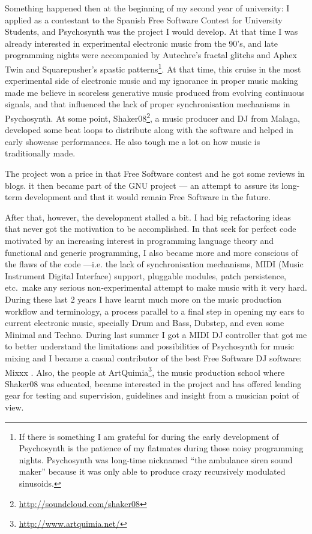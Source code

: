 Something happened then at the beginning of my second year of
university: I applied as a contestant to the Spanish Free Software
Contest for University Students, and Psychosynth was the project I
would develop. At that time I was already interested in experimental
electronic music from the 90's, and late programming nights were
accompanied by Autechre's fractal glitchs and Aphex Twin and
Squarepusher's spastic patterns\footnote{If there is something I am
  grateful for during the early development of Psychosynth is the
  patience of my flatmates during those noisy programming
  nights. Psychosynth was long-time nicknamed ``the ambulance siren
  sound maker'' because it was only able to produce crazy recursively
  modulated sinusoids.}. At that time, this cruise in the most
experimental side of electronic music and my ignorance in proper music
making made me believe in scoreless generative music produced from
evolving continuous signals, and that influenced the lack of proper
synchronisation mechanisms in Psychosynth. At some point,
Shaker08\footnote{\url{http://soundcloud.com/shaker08}}, a music producer
and DJ from Malaga, developed some beat loops to distribute along with
the software and helped in early showcase performances. He also
tough me a lot on how music is traditionally made.

The project won a price in that Free Software contest and he got some
reviews in blogs. it then became part of the GNU project --- an
attempt to assure its long-term development and that it would remain
Free Software in the future.

After that, however, the development stalled a bit. I had big
refactoring ideas that never got the motivation to be accomplished. In
that seek for perfect code motivated by an increasing interest in
programming language theory and functional and generic programming, I
also became more and more conscious of the flaws of the code
---i.e. the lack of synchronisation mechanisms, MIDI (Music Instrument
Digital Interface) support, pluggable modules, patch persistence,
etc.\ make any serious non-experimental attempt to make music with it
very hard. During these last 2 years I have learnt much more on the
music production workflow and terminology, a process parallel to a
final step in opening my ears to current electronic music, specially
Drum and Bass, Dubstep, and even some Minimal and Techno. During last
summer I got a MIDI DJ controller that got me to better understand the
limitations and possibilities of Psychosynth for music mixing and I
became a casual contributor of the best Free Software DJ software:
Mixxx \cite{andersen03mixxx}. Also, the people at
ArtQuimia\footnote{\url{http://www.artquimia.net/}}, the music production
school where Shaker08 was educated, became interested in the project
and has offered lending gear for testing and supervision, guidelines
and insight from a musician point of view.

